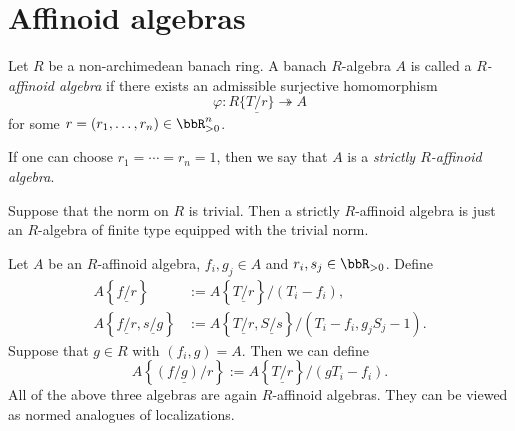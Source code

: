 \section{Affinoid algebras}


    \begin{definition}\label{def:affinoid_algebras}
        Let \(R\) be a non-archimedean banach ring.
        A banach \(R\)-algebra \(A\) is called a \emph{\(R\)-affinoid algebra} if there exists an admissible surjective homomorphism
        \[
            \varphi: R\{ \underline{T/r} \} \twoheadrightarrow A
        \]
        for some \(r = (r_1, \ldots, r_n) \in \bbR_{>0}^n\).

        If one can choose \(r_1 = \cdots = r_n = 1\), then we say that \(A\) is a \emph{strictly \(R\)-affinoid algebra}.
    \end{definition}

    \begin{example}\label{eg:affinoid_algebra_for_trivial_norm}
        Suppose that the norm on \(R\) is trivial.
        Then a strictly \(R\)-affinoid algebra is just an \(R\)-algebra of finite type equipped with the trivial norm.
    \end{example}

    \begin{example}\label{eg:normed_localization_as_affinoid_algebra}
        Let \(A\) be an \(R\)-affinoid algebra, \(f_i,g_j \in A\) and \(r_i,s_j \in \bbR_{>0}\).
        Define
        \begin{align*}
            A\left\{ \underline{f/r} \right\} & := A\left\{ \underline{T/r} \right\} / (T_i - f_i), \\
            A\left\{ \underline{f/r}, \underline{s/g} \right\} & := A\left\{ \underline{T/r}, \underline{S/s} \right\} / (T_i - f_i, g_j S_j - 1). 
        \end{align*}
        Suppose that \(g \in R\) with \((f_i,g) = A\).
        Then we can define
        \[
            A\left\{ \underline{(f/g)/r} \right\} := A\left\{ \underline{T/r} \right\} / (g T_i - f_i).
        \]
        All of the above three algebras are again \(R\)-affinoid algebras.
        They can be viewed as normed analogues of localizations.
    \end{example}

